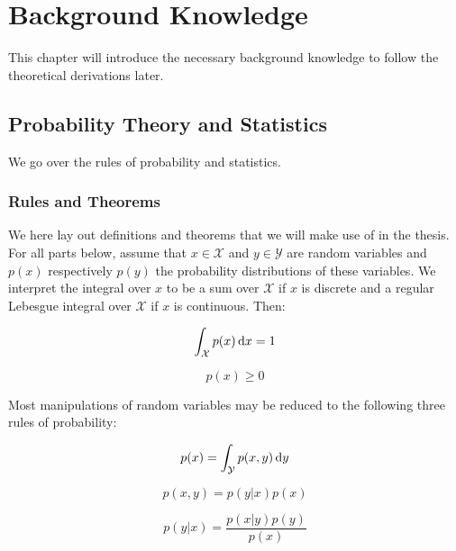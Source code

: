 
\chapter{Background Knowledge}
\label{BackgroundKnowledgeCh}

This chapter will introduce the necessary background knowledge to follow the
theoretical derivations later.

\section{Probability Theory and Statistics}

We go over the rules of probability and statistics.

\subsection{Rules and Theorems}

We here lay out definitions and theorems that we will make use of in the thesis.
For all parts below, assume that $x \in \mathcal{X}$ and $y \in \mathcal{Y}$ are
random variables and $p(x)$ respectively $p(y)$ the probability distributions
of these variables. We interpret the integral over $x$ to be a sum over
$\mathcal{X}$ if $x$ is discrete and a regular Lebesgue integral over
$\mathcal{X}$ if $x$ is continuous. Then:
\begin{definition}
  \label{eq:unit_vol_prob_axiom}
  \begin{equation*}
    \int_{\mathcal{X}}p(x) \dif x = 1
  \end{equation*}
\end{definition}
\begin{definition}
  \label{eq:non_neg_of_prob}
  \begin{equation*}
    p(x) \geq 0
  \end{equation*}
\end{definition}

Most manipulations of random variables may be reduced to the following three rules of probability:
\begin{theorem}
  \label{eq:sum_rule}
  \begin{equation*}
    p(x) = \int_{\mathcal{Y}}p(x, y) \dif y
  \end{equation*}
\end{theorem}
\begin{theorem}
  \label{eq:product_theorem}
  \begin{equation*}
    p(x, y) = p(y | x)p(x)
  \end{equation*}
\end{theorem}
\begin{theorem}
  \label{eq:Bayes_theorem}
  \begin{equation*}
    p(y | x) = \frac{p(x | y)p(y)}{p(x)}
  \end{equation*}
\end{theorem}


